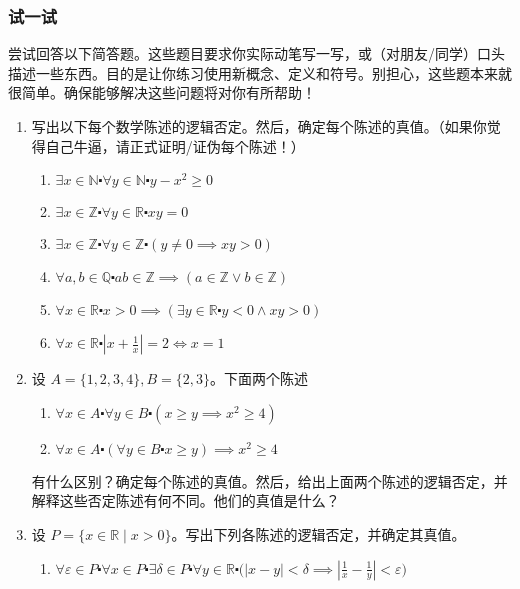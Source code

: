 \subsubsection*{试一试}

尝试回答以下简答题。这些题目要求你实际动笔写一写，或（对朋友/同学）口头描述一些东西。目的是让你练习使用新概念、定义和符号。别担心，这些题本来就很简单。确保能够解决这些问题将对你有所帮助！

\begin{enumerate}[label=(\arabic*)]
    \item 写出以下每个数学陈述的逻辑否定。然后，确定每个陈述的真值。（如果你觉得自己牛逼，请正式证明/证伪每个陈述！）
    \begin{enumerate}[label=(\alph*)]
        \item $\exists x \in \mathbb{N} \centerdot \forall y \in \mathbb{N} \centerdot y - x^2 \ge 0$
        \item $\exists x \in \mathbb{Z} \centerdot \forall y \in \mathbb{R} \centerdot xy = 0$
        \item $\exists x \in \mathbb{Z} \centerdot \forall y \in \mathbb{Z} \centerdot (y \ne 0 \implies xy > 0)$
        \item $\forall a, b \in \mathbb{Q} \centerdot ab \in \mathbb{Z} \implies (a \in \mathbb{Z} \lor b \in \mathbb{Z})$
        \item $\forall x \in \mathbb{R} \centerdot x > 0 \implies (\exists y \in \mathbb{R} \centerdot y < 0 \land xy > 0)$
        \item $\forall x \in \mathbb{R} \centerdot |x + \frac{1}{x}| = 2 \iff x = 1$
    \end{enumerate}
    \item 设 $A = \{1, 2, 3, 4\}, B = \{2, 3\}$。下面两个陈述
        \begin{enumerate}[label=(\alph*)]
            \item $\forall x \in A \centerdot \forall y \in B \centerdot (x \ge y \implies x^2 \ge 4)$
            \item $\forall x \in A \centerdot (\forall y \in B \centerdot x \ge y) \implies x^2 \ge 4$
        \end{enumerate}
        有什么区别？确定每个陈述的真值。然后，给出上面两个陈述的逻辑否定，并解释这些否定陈述有何不同。他们的真值是什么？
    \item 设 $P = \{x \in \mathbb{R} \mid x > 0\}$。写出下列各陈述的逻辑否定，并确定其真值。
        \begin{enumerate}[label=(\alph*)]
            \item $\forall \varepsilon \in P \centerdot \forall x \in P \centerdot \exists \delta \in P \centerdot \forall y \in \mathbb{R} \centerdot \Big(|x-y|<\delta \implies |\frac{1}{x} - \frac{1}{y}| < \varepsilon \Big)$

\end{enumerate}
\end{enumerate}
